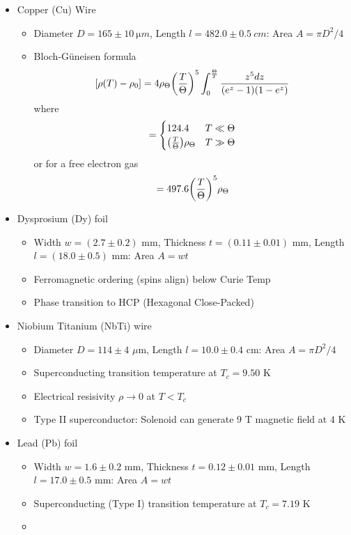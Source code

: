 \documentclass{article}
\begin{document}
\begin{itemize}
    \item Copper (Cu) Wire
    \begin{itemize}
        \item Diameter $D = 165 \pm \qty{10}{\micro m}$, Length $l = 482.0 \pm \qty{0.5}{cm}$: Area $A = \pi D^2/4$
        \item Bloch-G\"uneisen formula
        \begin{align} \label{eq:1} 
             [\rho(T) - \rho_0] = 4\rho_\Theta \qt(\frac{T}{\Theta})^5 \int_0^{\frac{\Theta}{T}} \frac{z^5 dz}{(e^z -1)(1 - e^z)}
        \end{align}
        where 
        \begin{align*}
            [\rho(T) - \rho_0] = \begin{cases}
                124.4  & T \ll \Theta \\
                \qt(\frac{T}{\Theta}) \rho_\Theta & T \gg \Theta
            \end{cases}
        \end{align*}    
        or for a free electron gas
        \begin{align*}
            [\rho(T) - \rho_0] = 497.6 \qt(\frac{T}{\Theta})^5 \rho_\Theta
        \end{align*}
    \end{itemize}
    \item Dysprosium (Dy) foil
    \begin{itemize}
        \item Width $w = (2.7 \pm 0.2)$ mm, Thickness $t = (0.11 \pm 0.01)$ mm, Length $l = (18.0 \pm 0.5)$ mm: Area $A = wt$
        \item Ferromagnetic ordering (spins align) below Curie Temp
        \item Phase transition to HCP (Hexagonal Close-Packed)
    \end{itemize}
    \item Niobium Titanium (NbTi) wire
    \begin{itemize}
        \item Diameter $D = 114 \pm 4$ $\mu$m, Length $l = 10.0 \pm 0.4$ cm: Area $A = \pi D^2/4$
        \item Superconducting transition temperature at $T_c = 9.50$ K \cite{manuel}
        \item Electrical resisivity $\rho \to 0$ at $T < T_c$
        \item Type II superconductor: Solenoid can generate $9$ T magnetic field at $4$ K
    \end{itemize}
    \item Lead (Pb) foil
    \begin{itemize}
        \item Width $w = 1.6 \pm 0.2$ mm, Thickness $t = 0.12 \pm 0.01$ mm, Length $l = 17.0 \pm 0.5$ mm: Area $A = wt$
        \item Superconducting (Type I) transition temperature at $T_c = 7.19$ K \cite{superlist}
        \item 
    \end{itemize}
\end{itemize}
\end{document}
